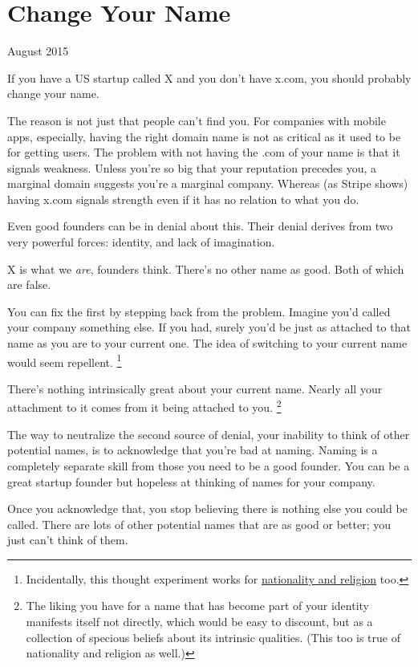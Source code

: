 \chapter{Change Your Name}

August 2015

If you have a US startup called X and you don't have x.com, you should
probably change your name.

The reason is not just that people can't find you. For companies with
mobile apps, especially, having the right domain name is not as critical
as it used to be for getting users. The problem with not having the .com
of your name is that it signals weakness. Unless you're so big that your
reputation precedes you, a marginal domain suggests you're a marginal
company. Whereas (as Stripe shows) having x.com signals strength even if
it has no relation to what you do.

Even good founders can be in denial about this. Their denial derives
from two very powerful forces: identity, and lack of imagination.

X is what we \emph{are}, founders think. There's no other name as good.
Both of which are false.

You can fix the first by stepping back from the problem. Imagine you'd
called your company something else. If you had, surely you'd be just as
attached to that name as you are to your current one. The idea of
switching to your current name would seem repellent.
\footnote{Incidentally, this thought experiment works for
\href{identity.html}{nationality and religion} too.}

There's nothing intrinsically great about your current name. Nearly all
your attachment to it comes from it being attached to you.
\footnote{The liking you have for a name that has become part of your
identity manifests itself not directly, which would be easy to discount,
but as a collection of specious beliefs about its intrinsic qualities.
(This too is true of nationality and religion as well.)}

The way to neutralize the second source of denial, your inability to
think of other potential names, is to acknowledge that you're bad at
naming. Naming is a completely separate skill from those you need to be
a good founder. You can be a great startup founder but hopeless at
thinking of names for your company.

Once you acknowledge that, you stop believing there is nothing else you
could be called. There are lots of other potential names that are as
good or better; you just can't think of them.

